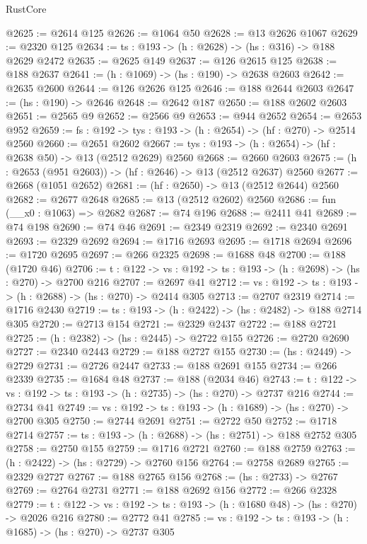 \begin{lexlean}{RustCore}
\begin{coremodule}
@2625 := @2614 @125
@2626 := @1064 @50
@2628 := @13 @2626 @1067
@2629 := @2320 @125
@2634 := {ts : @193} -> (h : @2628) -> (hs : @316) -> @188 @2629 @2472
@2635 := @2625 @149
@2637 := @126 @2615 @125
@2638 := @188 @2637
@2641 := (h : @1069) -> (hs : @190) -> @2638 @2603
@2642 := @2635 @2600
@2644 := @126 @2626 @125
@2646 := @188 @2644 @2603
@2647 := (hs : @190) -> @2646
@2648 := @2642 @187
@2650 := @188 @2602 @2603
@2651 := @2565 @9
@2652 := @2566 @9
@2653 := @944 @2652
@2654 := @2653 @952
@2659 := {fs : @192} -> {tys : @193} -> (h : @2654) -> (hf : @270) -> @2514 @2560
@2660 := @2651 @2602
@2667 := {tys : @193} -> (h : @2654) -> (hf : @2638 @50) -> @13 (@2512 @2629) @2560
@2668 := @2660 @2603
@2675 := (h : @2653 (@951 @2603)) -> (hf : @2646) -> @13 (@2512 @2637) @2560
@2677 := @2668 (@1051 @2652)
@2681 := (hf : @2650) -> @13 (@2512 @2644) @2560
@2682 := @2677 @2648
@2685 := @13 (@2512 @2602) @2560
@2686 := fun (__x0 : @1063) => @2682
@2687 := @74 @196
@2688 := @2411 @41
@2689 := @74 @198
@2690 := @74 @46
@2691 := @2349 @2319
@2692 := @2340 @2691
@2693 := @2329 @2692
@2694 := @1716 @2693
@2695 := @1718 @2694
@2696 := @1720 @2695
@2697 := @266 @2325
@2698 := @1688 @48
@2700 := @188 (@1720 @46)
@2706 := {t : @122} -> {vs : @192} -> {ts : @193} -> (h : @2698) -> (hs : @270) -> @2700 @216
@2707 := @2697 @41
@2712 := {vs : @192} -> {ts : @193} -> (h : @2688) -> (hs : @270) -> @2414 @305
@2713 := @2707 @2319
@2714 := @1716 @2430
@2719 := {ts : @193} -> (h : @2422) -> (hs : @2482) -> @188 @2714 @305
@2720 := @2713 @154
@2721 := @2329 @2437
@2722 := @188 @2721
@2725 := (h : @2382) -> (hs : @2445) -> @2722 @155
@2726 := @2720 @2690
@2727 := @2340 @2443
@2729 := @188 @2727 @155
@2730 := (hs : @2449) -> @2729
@2731 := @2726 @2447
@2733 := @188 @2691 @155
@2734 := @266 @2339
@2735 := @1684 @48
@2737 := @188 (@2034 @46)
@2743 := {t : @122} -> {vs : @192} -> {ts : @193} -> (h : @2735) -> (hs : @270) -> @2737 @216
@2744 := @2734 @41
@2749 := {vs : @192} -> {ts : @193} -> (h : @1689) -> (hs : @270) -> @2700 @305
@2750 := @2744 @2691
@2751 := @2722 @50
@2752 := @1718 @2714
@2757 := {ts : @193} -> (h : @2688) -> (hs : @2751) -> @188 @2752 @305
@2758 := @2750 @155
@2759 := @1716 @2721
@2760 := @188 @2759
@2763 := (h : @2422) -> (hs : @2729) -> @2760 @156
@2764 := @2758 @2689
@2765 := @2329 @2727
@2767 := @188 @2765 @156
@2768 := (hs : @2733) -> @2767
@2769 := @2764 @2731
@2771 := @188 @2692 @156
@2772 := @266 @2328
@2779 := {t : @122} -> {vs : @192} -> {ts : @193} -> (h : @1680 @48) -> (hs : @270) -> @2026 @216
@2780 := @2772 @41
@2785 := {vs : @192} -> {ts : @193} -> (h : @1685) -> (hs : @270) -> @2737 @305

\end{coremodule}
\end{lexlean}
